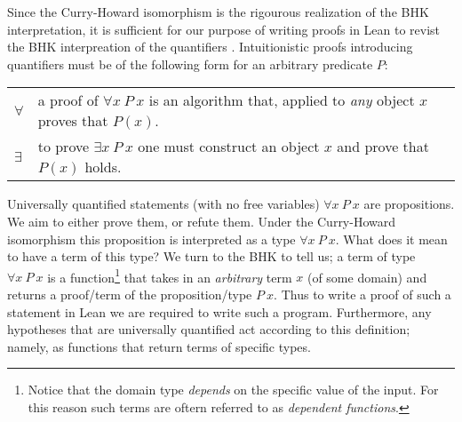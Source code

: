 \documentclass{book}
\begin{document}
    Since the Curry-Howard isomorphism is the rigourous realization of the BHK interpretation, it is sufficient for our purpose of writing proofs in Lean to revist the BHK interpreation of the quantifiers \cite{sep-mathematics-constructive}. Intuitionistic proofs introducing quantifiers must be of the following form for an arbitrary predicate $P$: 
	
	\vspace{0.2cm}
	
	\begin{center}
		\begin{tabular}{p{1.5cm}p{8cm}}
		$\forall$ & a proof of $\forall x \ P \ x$ is an algorithm that, applied to \emph{any} object $x$ proves that $P(x)$.\\
		$\exists$ & to prove $\exists x \ P \ x$ one must construct an object $x$ and prove that $P(x)$ holds. 
		\end{tabular}
	\end{center}
    
    Universally quantified statements (with no free variables) $\forall x \ P \ x$ are propositions. We aim to either prove them, or refute them. Under the Curry-Howard isomorphism this proposition is interpreted as a type $\forall x \ P \ x$. What does it mean to have a term of this type? We turn to the BHK to tell us; a term of type $\forall x \ P \ x$ is a function\footnote{Notice that the domain type \emph{depends} on the specific value of the input. For this reason such terms are oftern referred to as \emph{dependent functions}.} that takes in an \emph{arbitrary} term $x$ (of some domain) and returns a proof/term of the proposition/type $P \ x$. Thus to write a proof of such a statement in Lean we are required to write such a program. Furthermore, any hypotheses that are universally quantified act according to this definition; namely, as functions that return terms of specific types. 
\end{document}
